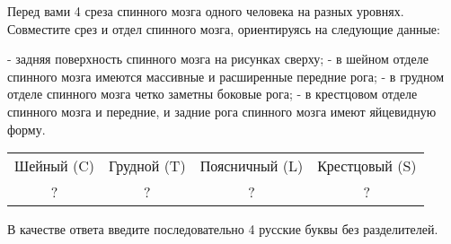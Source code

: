 
Перед вами 4 среза спинного мозга одного человека на разных уровнях. Совместите срез и отдел спинного мозга, ориентируясь на следующие данные:

- задняя поверхность спинного мозга на рисунках сверху;
- в шейном отделе спинного мозга имеются массивные и расширенные передние рога;
- в грудном отделе спинного мозга четко заметны боковые рога;
- в крестцовом отделе спинного мозга и передние, и задние рога спинного мозга имеют яйцевидную форму.



\begin{tabular}{|c|c|c|c|}
    Шейный (C) & Грудной (T) & Поясничный (L) & Крестцовый (S) \\
    ? & ? & ? & ? \\
\end{tabular}

В качестве ответа введите последовательно 4 русские буквы без разделителей.

